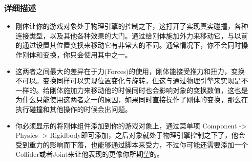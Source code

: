 \documentclass[9pt, b5paper]{article}
\begin{document}
\subsubsection{详细描述}
\label{sec:org25fb221}
\begin{itemize}
\item 刚体让你的游戏对象处于物理引擎的控制之下，这打开了实现真实碰撞，各种连接类型，以及其他各种效果的大门。通过给刚体施加外力来移动它，与以前的通过设置其位置变换来移动它有非常大的不同。通常情况下，你不会同时操作刚体和变换，你只会使用其中之一。
\item 这两者之间最大的差异在于力(Forces)的使用，刚体能接受推力和扭力，变换不可以。变换同样可以实现位置变化与旋转，但这与通过物理引擎来实现是不一样的。给刚体施加力来移动他的时候同时也会影响对象的变换数值，这也是为什么只能使用这两者之一的原因，如果同时直接操作了刚体的变换，那么在执行碰撞和其他操作的时候会出问题。
\item 你必须显示的将刚体组件添加到你的游戏对象上，通过菜单项 Component -> Physics -> Rigidbody即可添加，之后对象就处于物理引擎控制之下了，他会受到重力的影响而下落，也能够通过脚本来受力，不过你可能还需要添加一个Collider或者Joint来让他表现的更像你所期望的。
\end{itemize}
\end{document}
